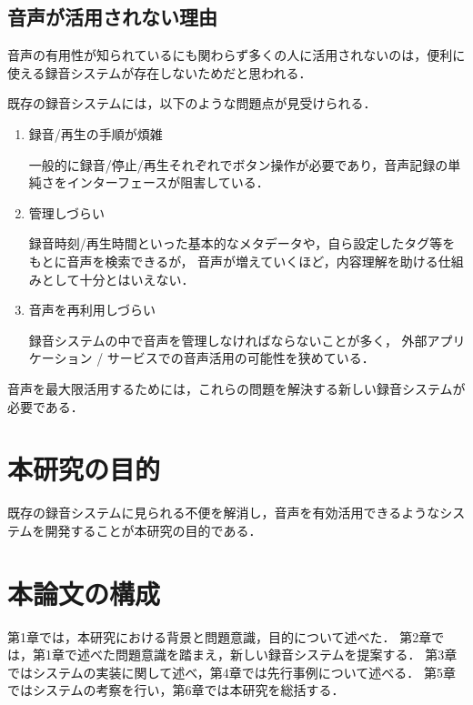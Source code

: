 \subsection{音声が活用されない理由}

音声の有用性が知られているにも関わらず多くの人に活用されないのは，便利に使える録音システムが存在しないためだと思われる．

既存の録音システムには，以下のような問題点が見受けられる．

\begin{enumerate}
\item 録音/再生の手順が煩雑

一般的に録音/停止/再生それぞれでボタン操作が必要であり，音声記録の単純さをインターフェースが阻害している．

\item 管理しづらい

録音時刻/再生時間といった基本的なメタデータや，自ら設定したタグ等をもとに音声を検索できるが，
音声が増えていくほど，内容理解を助ける仕組みとして十分とはいえない．

\item 音声を再利用しづらい

録音システムの中で音声を管理しなければならないことが多く，
外部アプリケーション / サービスでの音声活用の可能性を狭めている．

\end{enumerate}

音声を最大限活用するためには，これらの問題を解決する新しい録音システムが必要である．

\section{本研究の目的}

既存の録音システムに見られる不便を解消し，音声を有効活用できるようなシステムを開発することが本研究の目的である．

\section{本論文の構成}

第1章では，本研究における背景と問題意識，目的について述べた．
第2章では，第1章で述べた問題意識を踏まえ，新しい録音システムを提案する．
第3章ではシステムの実装に関して述べ，第4章では先行事例について述べる．
第5章ではシステムの考察を行い，第6章では本研究を総括する．